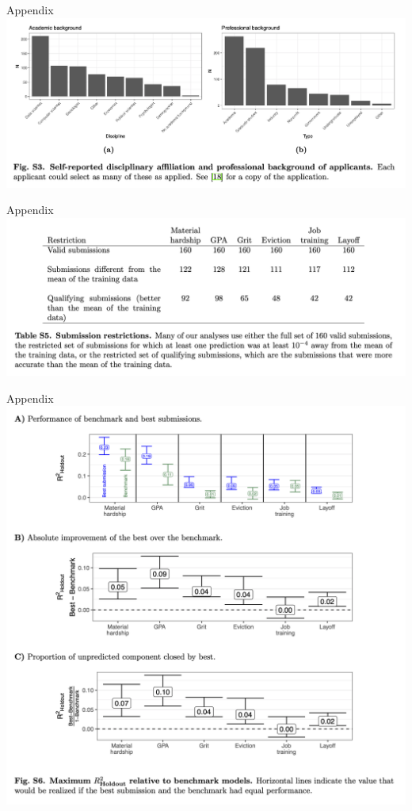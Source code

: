 \documentclass{beamer}
\begin{document}
\begin{frame}{Appendix}
\includegraphics[width = \textwidth]{figures/si_disciplines}
\end{frame}

\begin{frame}{Appendix}
\includegraphics[width = \textwidth]{figures/si_qualifying_table}
\end{frame}

\begin{frame}{Appendix}
\centering
\includegraphics[height = .8\textheight]{figures/si_best_vs_benchmark}
\end{frame}
\end{document}
